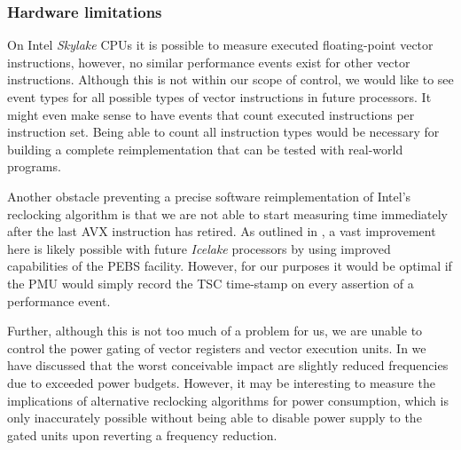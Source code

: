 \subsubsection{Hardware limitations}
\label{sec:conclusion:futurework:hardware}

On Intel \textit{Skylake} \glspl{CPU} it is possible to measure executed floating-point vector instructions, however, no similar performance events exist for other vector instructions. Although this is not within our scope of control, we would like to see event types for all possible types of vector instructions in future processors. It might even make sense to have events that count executed instructions per instruction set. Being able to count all instruction types would be necessary for building a complete reimplementation that can be tested with real-world programs.

Another obstacle preventing a precise software reimplementation of Intel's reclocking algorithm is that we are not able to start measuring time immediately after the last \gls{AVX} instruction has retired. As outlined in , a vast improvement here is likely possible with future \textit{Icelake} processors by using improved capabilities of the \gls{PEBS} facility. However, for our purposes it would be optimal if the \gls{PMU} would simply record the \gls{TSC} time-stamp on every assertion of a performance event.

Further, although this is not too much of a problem for us, we are unable to control the power gating of vector registers and vector execution units. In  we have discussed that the worst conceivable impact are slightly reduced frequencies due to exceeded power budgets. However, it may be interesting to measure the implications of alternative reclocking algorithms for power consumption, which is only inaccurately possible without being able to disable power supply to the gated units upon reverting a frequency reduction.